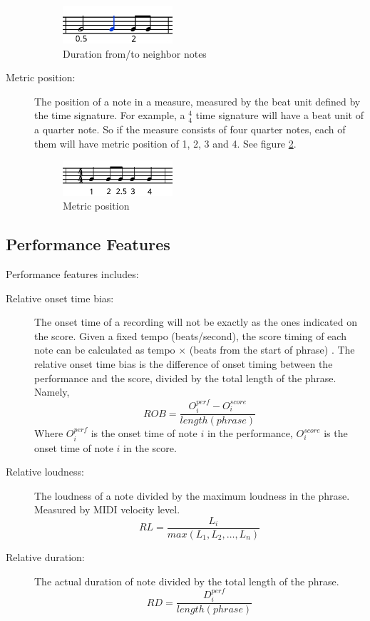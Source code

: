 \begin{description}
      \begin{figure}[tp]
         \begin{center}
            \includegraphics[width=0.4\textwidth]{fig/duration}
         \end{center}
         \caption{Duration from/to neighbor notes}
         \label{fig:duration}
      \end{figure}
   \item [Metric position:] The position of a note in a measure, measured by the beat unit defined by the time signature. For example, a $^4_4$ time signature will have a beat unit of a quarter note. So if the measure consists of four quarter notes, each of them will have metric position of 1, 2, 3 and 4. See figure \ref{fig:metrical}.

   \begin{figure}[tp]
      \begin{center}
         \includegraphics[width=0.4\textwidth]{fig/metrical}
      \end{center}
      \caption{Metric position}
      \label{fig:metrical}
   \end{figure}
      \end{description}

      \subsection{Performance Features}
      Performance features includes:
      \begin{description}
         \item [Relative onset time bias:] 
            The onset time of a recording will not be exactly as the ones indicated on the score. Given a fixed tempo (beats/second), the score timing of each note can be calculated as tempo $\times$ (beats from the start of phrase)  . The relative onset time bias is the difference of onset timing between the performance and the score, divided by the total length of the phrase. Namely,
            $$ ROB = \frac{O_i^{perf} - O_i^{score}  }{length(phrase)}$$ Where $O_i^{perf}$ is the onset time of note $i$ in the performance, $O_i^{score}$ is the onset time of note $i$ in the score. 
         \item [Relative loudness:] The loudness of a note divided by the maximum loudness in the phrase. Measured by MIDI velocity level.
            $$ RL = \frac{L_i}{max(L_1, L_2, \dots, L_n)}$$

         \item [Relative duration:]
            The actual duration of note divided by the total length of the phrase.
            $$ RD = \frac{ D_i^{perf}}{length(phrase)}$$
      \end{description}

